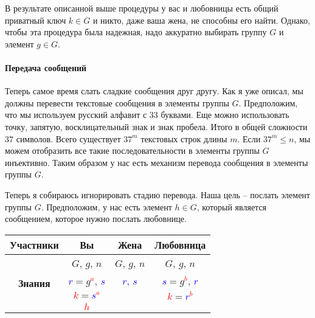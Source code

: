 В результате описанной выше процедуры у вас и любовницы есть общий приватный ключ $k\in G$ и никто, даже ваша жена, не способны его найти. Однако, чтобы эта процедура была надежная, надо аккуратно выбирать  группу $G$ и элемент $g\in G$.

\paragraph{Передача сообщений}

Теперь самое время слать сладкие сообщения друг другу.
Как я уже описал, мы должны перевести текстовые сообщения в элементы группы $G$.
Предположим, что мы используем русский алфавит с $33$ буквами. Еще можно использовать точку, запятую, восклицательный знак и знак пробела. Итого в общей сложности $37$ символов.
Всего существует $37^m$ текстовых строк длины $m$.
Если $37^m \leqslant n$, мы можем отобразить все такие последовательности в элементы группы $G$ инъективно. 
Таким образом у нас есть механизм перевода сообщения в элементы группы $G$.

Теперь я собираюсь игнорировать стадию перевода.
Наша цель -- послать элемент группы $G$. Предположим, у нас есть элемент $h\in G$, который является сообщением, которое нужно послать любовнице.
\begin{center}
\begin{tabular}{|c|c|c|c|}
\hline
{\bf Участники}&{Вы}&{Жена}&{Любовница}\\
\hline
\multirow{4}{*}{\bf Знания}&{\textcolor{OliveGreen}{$G$}, \textcolor{OliveGreen}{$g$}, \textcolor{OliveGreen}{$n$}}&{\textcolor{OliveGreen}{$G$}, \textcolor{OliveGreen}{$g$}, \textcolor{OliveGreen}{$n$}}&{\textcolor{OliveGreen}{$G$}, \textcolor{OliveGreen}{$g$}, \textcolor{OliveGreen}{$n$}}\\
{}&{ \textcolor{blue}{$r$}$=$\textcolor{OliveGreen}{$ g$}\textcolor{red}{${}^a$}, \textcolor{blue}{$s$}}&{\textcolor{blue}{$r$, $s$}}&{ \textcolor{blue}{$s$}$=$\textcolor{OliveGreen}{$g$}\textcolor{red}{${}^b$}, \textcolor{blue}{$r$}}\\
{}&{ \textcolor{red}{$k$}$=$\textcolor{blue}{$s$}\textcolor{red}{${}^a$}}&{}&{ \textcolor{red}{$k$}$=$\textcolor{blue}{$r$}\textcolor{red}{${}^b$}}\\
{}&{\textcolor{red}{$h$}}&{}&{}\\
\hline
\end{tabular}
\end{center}

